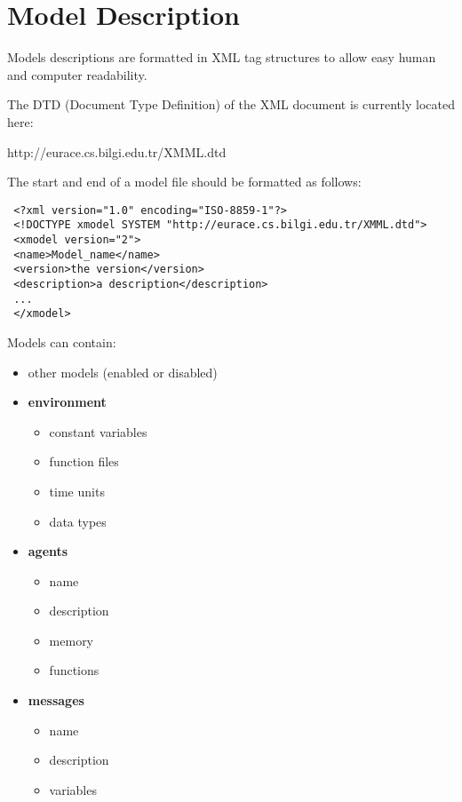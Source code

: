 \section{Model Description}

Models descriptions are formatted in XML tag structures to allow
easy human and computer readability.

The DTD (Document Type Definition) of the XML document is currently located
here:

http://eurace.cs.bilgi.edu.tr/XMML.dtd

The start and end of a model file should be formatted as follows:

\begin{mylisting}
\begin{verbatim}
 <?xml version="1.0" encoding="ISO-8859-1"?>
 <!DOCTYPE xmodel SYSTEM "http://eurace.cs.bilgi.edu.tr/XMML.dtd">
 <xmodel version="2">
 <name>Model_name</name>
 <version>the version</version>
 <description>a description</description>
 ...
 </xmodel>
\end{verbatim}
\end{mylisting}

Models can contain:
\begin{itemize}
\item other models (enabled or disabled)
\item \textbf{environment}
\begin{itemize}
\item constant variables
\item function files
\item time units
\item data types
\end{itemize}
\item \textbf{agents}
\begin{itemize}
\item name
\item description
\item memory
\item functions
\end{itemize}
\item \textbf{messages}
\begin{itemize}
\item name
\item description
\item variables
\end{itemize}
\end{itemize}

